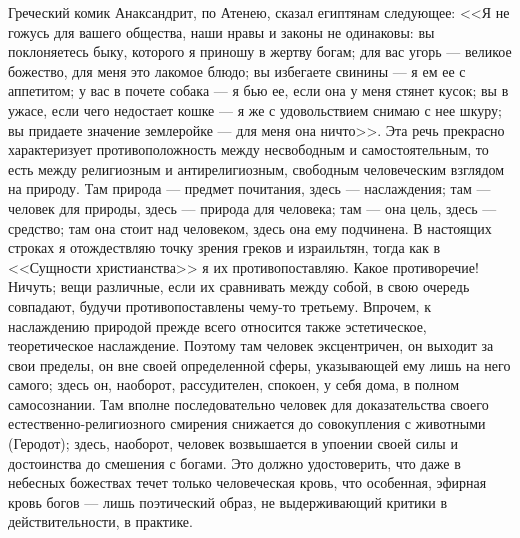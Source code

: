 \documentclass[12pt]{article}
\begin{document}
Греческий комик Анаксандрит, по Атенею, сказал египтянам следующее: <<Я не гожусь для вашего общества, наши нравы и законы не одинаковы: вы поклоняетесь быку, которого я приношу в жертву богам; для вас угорь --- великое божество, для меня это лакомое блюдо; вы избегаете свинины --- я ем ее с аппетитом; у вас в почете собака --- я бью ее, если она у меня стянет кусок; вы в ужасе, если чего недостает кошке --- я же с удовольствием снимаю с нее шкуру; вы придаете значение землеройке --- для меня она ничто>>. Эта речь прекрасно характеризует противоположность между несвободным и самостоятельным, то есть между религиозным и антирелигиозным, свободным человеческим взглядом на природу. Там природа --- предмет почитания, здесь --- наслаждения; там --- человек для природы, здесь --- природа для человека; там --- она цель, здесь --- средство; там она стоит над человеком, здесь она ему подчинена. В настоящих строках я отождествляю точку зрения греков и израильтян, тогда как в <<Сущности христианства>> я их противопоставляю. Какое противоречие! Ничуть; вещи различные, если их сравнивать между собой, в свою очередь совпадают, будучи противопоставлены чему-то третьему. Впрочем, к наслаждению природой прежде всего относится также эстетическое, теоретическое наслаждение. Поэтому там человек эксцентричен, он выходит за свои пределы, он вне своей определенной сферы, указывающей ему лишь на него самого; здесь он, наоборот, рассудителен, спокоен, у себя дома, в полном самосознании. Там вполне последовательно человек для доказательства своего естественно-религиозного смирения снижается до совокупления с животными (Геродот); здесь, наоборот, человек возвышается в упоении своей силы и достоинства до смешения с богами. Это должно удостоверить, что даже в небесных божествах течет только человеческая кровь, что особенная, эфирная кровь богов --- лишь поэтический образ, не выдерживающий критики в действительности, в практике.



\section{}
\end{document}
